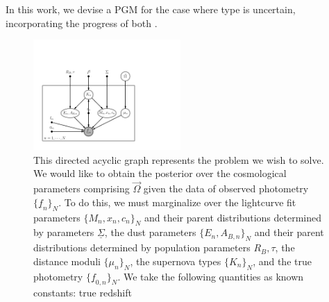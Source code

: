 \documentclass[12pt, onecolumn]{emulateapj}
\newcommand{\textul}{\underline}
\begin{document}
In this work, we devise a PGM for the case where type is uncertain, incorporating the progress of both \citet{Kunz07, Mandel16}.
%
\begin{figure}
\vspace{0.5cm}
\begin{center}
\includegraphics[width=0.5\textwidth]{sn-draft.png}
\caption{This directed acyclic graph represents the problem we wish to solve.  We would like to obtain the posterior over the cosmological parameters comprising $\vec{\Omega}$ given the data of observed photometry $\{\textul{f}_{n}\}_{N}$.  To do this, we must marginalize over the lightcurve fit parameters $\{M_{n},x_{n},c_{n}\}_{N}$ and their parent distributions determined by parameters $\textul{\Sigma}$, the dust parameters $\{E_{n},A_{B,n}\}_{N}$ and their parent distributions determined by population parameters $R_{B},\tau$, the distance moduli $\{\mu_{n}\}_{N}$, the supernova types $\{K_{n}\}_{N}$, and the true photometry $\{\textul{f}_{0,n}\}_{N}$.  We take the following quantities as known constants: true redshift}
\label{fig:pgm}
\end{center}
\end{figure}
\end{document}
